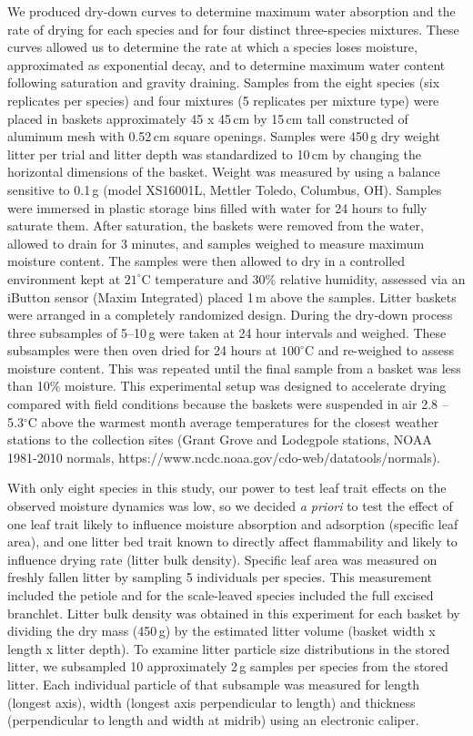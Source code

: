\documentclass[letterpaper,12pt]{article}
\begin{document}
We produced dry-down curves to determine maximum water absorption and the rate
of drying for each species and for four distinct three-species mixtures. These
curves allowed us to determine the rate at which a species loses moisture,
approximated as exponential decay, and to determine maximum water content
following saturation and gravity draining. Samples from the eight species (six
replicates per species) and four mixtures (5 replicates per mixture type) were
placed in baskets approximately 45 x 45\,cm by 15\,cm tall constructed of
aluminum mesh with 0.52\,cm square openings. Samples were 450\,g dry weight
litter per trial and litter depth was standardized to 10\,cm by changing the
horizontal dimensions of the basket. Weight was measured by using a balance
sensitive to 0.1\,g (model XS16001L, Mettler Toledo, Columbus, OH). Samples
were immersed in plastic storage bins filled with water for 24 hours to fully
saturate them. After saturation, the baskets were removed from the water,
allowed to drain for 3 minutes, and samples weighed to measure maximum moisture
content. The samples were then allowed to dry in a controlled environment kept
at $21^\circ$C temperature and 30\% relative humidity, assessed via an iButton
sensor (Maxim Integrated) placed 1\,m above the samples. Litter baskets were
arranged in a completely randomized design. During the dry-down process three
subsamples of 5--10\,g were taken at 24 hour intervals and weighed. These
subsamples were then oven dried for 24 hours at $100^\circ$C and re-weighed to
assess moisture content. This was repeated until the final sample from a basket
was less than 10\% moisture. This experimental setup was designed to accelerate
drying compared with field conditions because the baskets were suspended in air
2.8 -- 5.3$^\circ$C above the warmest month average temperatures for the
closest weather stations to the collection sites (Grant Grove and Lodegpole
stations, NOAA 1981-2010 normals,
https://www.ncdc.noaa.gov/cdo-web/datatools/normals).


With only eight species in this study, our power to test leaf trait effects on
the observed moisture dynamics was low, so we decided \emph{a priori} to test
the effect of one leaf trait likely to influence moisture absorption and
adsorption (specific leaf area), and one litter bed trait known to directly
affect flammability and likely to influence drying rate (litter bulk density).
Specific leaf area was measured on freshly fallen litter by sampling 5
individuals per species. This measurement included the petiole and for the
scale-leaved species included the full excised branchlet. Litter bulk density
was obtained in this experiment for each basket by dividing the dry mass
(450\,g) by the estimated litter volume (basket width x length x litter depth).
To examine litter particle size distributions in the stored litter, we
subsampled 10 approximately 2\,g samples per species from the stored litter.
Each individual particle of that subsample was measured for length (longest
axis), width (longest axis perpendicular to length) and thickness
(perpendicular to length and width at midrib) using an electronic caliper.
\end{document}
